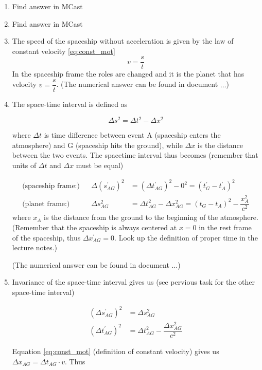 \documentclass[a4paper,10pt,english]{article}
\begin{document}
\begin{enumerate}
\item Find answer in MCast
\item Find answer in MCast\\
\item The speed of the spaceship without acceleration is given by the law of constant velocity \ref{eq:const_mot}
\[
v=\dfrac{s}{t}
\]
In the spaceship frame the roles are changed and it is the planet that has velocity $v=\dfrac{s}{t}$. (The numerical answer can be found in document $\ldots$)
\item The space-time interval is defined as

\begin{equation*}
\Delta s^2=\Delta t^2-\Delta x^2
\end{equation*}

where $\Delta t$ is time difference between event A (spaceship enters the atmosphere) and G (spaceship hits the ground), while $\Delta x$ is the distance between the two events. The spacetime interval thus becomes (remember that units of $\Delta t$ and $\Delta x$ must be equal)

\begin{align*}
\text{(spaceship frame:)} && \Delta (s_{AG}^{\prime})^2&=(\Delta t_{AG}^{\prime})^{2}-0^{2}=\left(t_G^{\prime}-t_A^{\prime}\right)^2\\
\text{(planet frame:)} && \Delta s_{AG}^2&=\Delta t_{AG}^2-\Delta x_{AG}^2=\left(t_G-t_A\right)^2-\dfrac{x_A^2}{c^2}
\end{align*}
where $x_A$ is the distance from the ground to the beginning of the atmosphere.\\ (Remember that the spaceship is always centered at $x=0$ in the rest frame of the spaceship, thus $\Delta x^{\prime}_{AG}=0$. Look up the definition of proper time in the lecture notes.)

(The numerical answer can be found in document $\ldots$)
\item Invariance of the space-time interval gives us (see pervious task for the other space-time interval)

\begin{align*}
(\Delta s_{AG}^{\prime})^{2}&=\Delta s_{AG}^{2}\\
(\Delta t_{AG}^{\prime})^2&=\Delta t_{AG}^2-\dfrac{\Delta x_{AG}^2}{c^2}
\end{align*}

Equation \ref{eq:const_mot} (definition of constant velocity) gives us $\Delta x_{AG}=\Delta t_{AG}\cdot v$. Thus


\end{enumerate}
\end{document}
